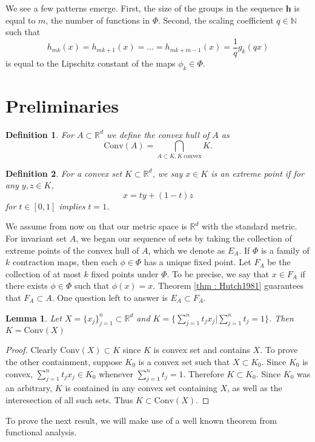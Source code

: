 \documentclass [52pt] {article}
\newcommand{\R}{\mathbb{R}}
\newcommand{\N}{\mathbb{N}}
\newcommand{\conv}{\text{Conv}}
\newtheorem{lemma}{Lemma}
\newtheorem{definition}{Definition}
\begin{document}
We see a few patterns emerge.  First, the size of the groups in the sequence $\mathbf{h}$ is equal to $m$, the number of functions in $\Phi$.  Second, the scaling coefficient $q\in\N$ such that
\[h_{mk}(x) = h_{mk+1}(x) = ...= h_{mk+m-1}(x) = \frac{1}{q} g_k(qx)\]
is equal to the Lipschitz constant of the maps $\phi_k\in\Phi$. 

\section{Preliminaries}

\begin{definition}
For $A\subset\R^d$ we define the convex hull of $A$ as
\[\conv(A) = \bigcap_{A\subset K,K\:\text{convex}} K.\]
\end{definition}

\begin{definition}
For a convex set $K\subset \R^d$, we say $x\in K$ is an extreme point if for any $y,z\in K$, 
\[x = ty+(1-t)z\]
for $t\in[0,1]$ implies $t = 1$.
\end{definition}
We assume from now on that our metric space is $\R^d$ with the standard metric.  For invariant set $A$, we began our sequence of sets by taking the collection of extreme points of the convex hull of $A$, which we denote as $E_A$.  If $\Phi$ is a family of $k$ contraction maps, then each $\phi\in\Phi$ has a unique fixed point.  Let $F_A$ be the collection of at most $k$ fixed points under $\Phi$.  To be precise, we say that $x\in F_A$ if there exists $\phi\in\Phi$ such that $\phi(x) = x$.  Theorem \ref{thm : Hutch1981} guarantees that $F_A \subset A$.  One question left to answer is $E_A\subset F_A$.  

\begin{lemma}\label{lemma : conv_def}
Let $X = \{x_j\}_{j=1}^n\subset \R^d$ and $K = \{\sum_{j=1}^nt_jx_j|\sum_{j=1}^n t_j = 1\}$.  Then $K = \conv(X)$
\end{lemma} 
\begin{proof}
Clearly $\conv(X)\subset K$ since $K$ is convex set and contains $X$.  To prove the other containment, suppose $K_0$ is a convex set such that $X\subset K_0$.  Since $K_0$ is convex, $\sum_{j=1}^nt_jx_j \in K_0$ whenever $\sum_{j = 1}^n t_j = 1$.  Therefore $K\subset K_0$.  Since $K_0$ was an arbitrary, $K$ is contained in any convex set containing $X$, as well as the interesection of all such sets.  Thus $K\subset \conv(X)$.
\end{proof}

To prove the next result, we will make use of a well known theorem from functional analysis.
\end{document}
